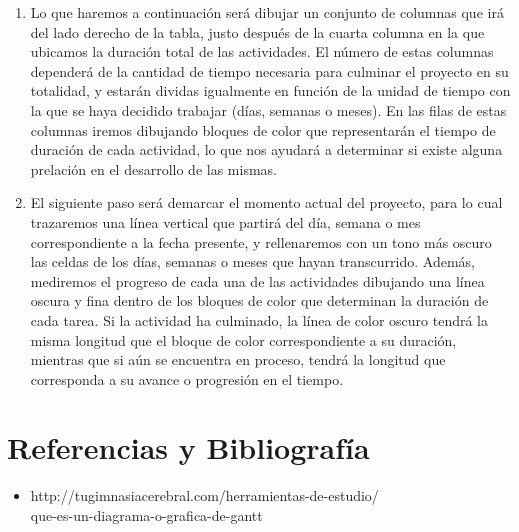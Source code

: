\documentclass{mylib/reporteCorto}
\begin{document}
\begin{enumerate}
    \item
    Lo que haremos a continuación será dibujar un conjunto de columnas que irá del lado derecho de la tabla, justo después de la cuarta columna en la que ubicamos la duración total de las actividades. El número de estas columnas dependerá de la cantidad de tiempo necesaria para culminar el proyecto en su totalidad, y estarán dividas igualmente en función de la unidad de tiempo con la que se haya decidido trabajar (días, semanas o meses). En las filas de estas columnas iremos dibujando bloques de color que representarán el tiempo de duración de cada actividad, lo que nos ayudará a determinar si existe alguna prelación en el desarrollo de las mismas.

    \item

    El siguiente paso será demarcar el momento actual del proyecto, para lo cual trazaremos una línea vertical que partirá del día, semana o mes correspondiente a la fecha presente, y rellenaremos con un tono más oscuro las celdas de los días, semanas o meses que hayan transcurrido. Además, mediremos el progreso de cada una de las actividades dibujando una línea oscura y fina dentro de los bloques de color que determinan la duración de cada tarea. Si la actividad ha culminado, la línea de color oscuro tendrá la misma longitud que el bloque de color correspondiente a su duración, mientras que si aún se encuentra en proceso, tendrá la longitud que corresponda a su avance o progresión en el tiempo.


\end{enumerate}
\section{Referencias y Bibliografía}
\begin{itemize}
  \item http://tugimnasiacerebral.com/herramientas-de-estudio/\\que-es-un-diagrama-o-grafica-de-gantt
\end{itemize}
\end{document}
